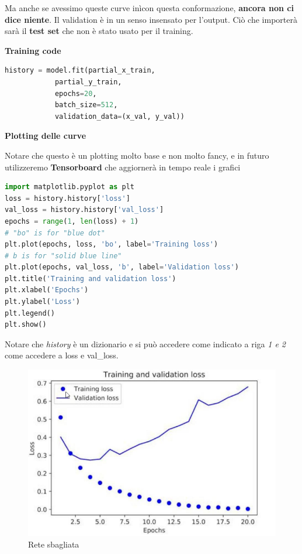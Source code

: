 Ma anche se avessimo queste curve inìcon questa conformazione, \textbf{ancora
    non ci dice niente}. Il validation è in un senso insensato per l'output. Ciò
che importerà sarà il \textbf{test set} che non è stato usato per il training.

\textbf{Training code}

\begin{lstlisting}[language=Python]
history = model.fit(partial_x_train,
            partial_y_train,
            epochs=20,
            batch_size=512,
            validation_data=(x_val, y_val))
\end{lstlisting}

\textbf{Plotting delle curve}

Notare che questo è un plotting molto base e non molto fancy, e in futuro
utilizzeremo \textbf{Tensorboard} che aggiornerà in tempo reale i grafici

\begin{lstlisting}[language=Python]
import matplotlib.pyplot as plt
loss = history.history['loss']
val_loss = history.history['val_loss']
epochs = range(1, len(loss) + 1)
# "bo" is for "blue dot"
plt.plot(epochs, loss, 'bo', label='Training loss')
# b is for "solid blue line"
plt.plot(epochs, val_loss, 'b', label='Validation loss')
plt.title('Training and validation loss')
plt.xlabel('Epochs')
plt.ylabel('Loss')
plt.legend()
plt.show()
\end{lstlisting}

Notare che \textit{history} è un dizionario e si può accedere come indicato a
riga \textit{1 e 2} come accedere a loss e val\_loss.
\begin{figure}[H]
    \centering
    \includegraphics[width=0.8\linewidth]{images/wrong network.png}
    \caption{Rete sbagliata}
    \label{fig:loss}
\end{figure}

